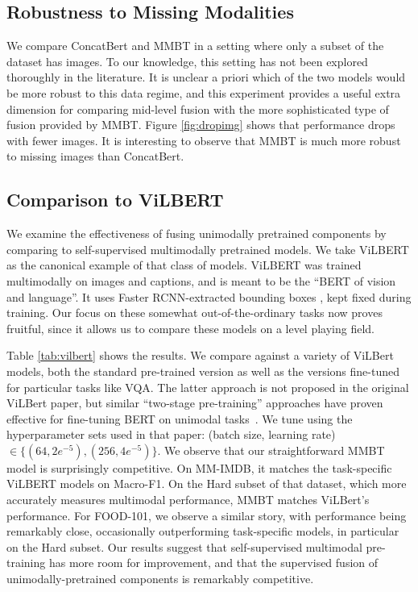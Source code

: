 \documentclass[11pt,a4paper]{article}
\begin{document}
\subsection{Robustness to Missing Modalities} 

We compare ConcatBert and MMBT in a setting where only a subset of the dataset has images. To our knowledge, this setting has not been explored thoroughly in the literature. It is unclear a priori which of the two models would be more robust to this data regime, and this experiment provides a useful extra dimension for comparing mid-level fusion with the more sophisticated type of fusion provided by MMBT. Figure \ref{fig:dropimg} shows that performance drops with fewer images. 
It is interesting to observe that MMBT is much more robust to missing images than ConcatBert.

\subsection{Comparison to ViLBERT}

We examine the effectiveness of fusing unimodally pretrained components by comparing to self-supervised multimodally pretrained models. We take ViLBERT \cite{Lu:2019vilbert} as the canonical example of that class of models. ViLBERT was trained multimodally on images and captions, and is meant to be the ``BERT of vision and language''. It uses Faster RCNN-extracted bounding boxes
, kept fixed during training. Our focus on these somewhat out-of-the-ordinary tasks now proves fruitful, since it allows us to compare these models on a level playing field.

Table \ref{tab:vilbert} shows the results. We compare against a variety of ViLBert models, both the standard pre-trained version as well as the versions fine-tuned for particular tasks like VQA. The latter approach is not proposed in the original ViLBert paper, but similar ``two-stage pre-training'' approaches have proven effective for fine-tuning BERT on unimodal tasks~\cite{Phang2018sentence}.
We tune using the hyperparameter sets used in that paper: (batch size, learning rate) $\in \{(64, 2e^{-5}), (256, 4e^{-5})\}$.
We observe that our straightforward MMBT model is surprisingly competitive. On MM-IMDB, it matches the task-specific ViLBERT models on Macro-F1. On the Hard subset of that dataset, which more accurately measures multimodal performance, MMBT matches ViLBert's performance. For FOOD-101, we observe a similar story, with performance being remarkably close, occasionally outperforming task-specific models, in particular on the Hard subset. Our results suggest that self-supervised multimodal pre-training has more room for improvement, and that the supervised fusion of unimodally-pretrained components is remarkably competitive.
\end{document}
